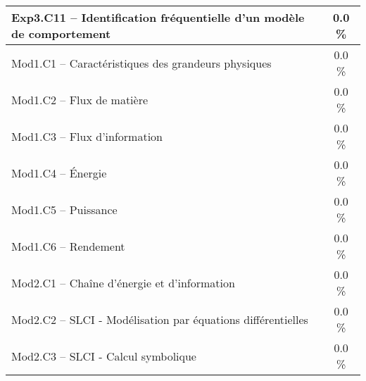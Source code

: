 \begin{center}
\begin{tabular}{|p{.7\linewidth}|c|}
Exp3.C11 -- Identification fréquentielle d’un modèle de comportement&0.0 \% \\ \hline 
Mod1.C1 -- Caractéristiques des grandeurs physiques&0.0 \% \\ \hline 
Mod1.C2 -- Flux de matière&0.0 \% \\ \hline 
Mod1.C3 -- Flux d’information&0.0 \% \\ \hline 
Mod1.C4 -- Énergie&0.0 \% \\ \hline 
Mod1.C5 -- Puissance&0.0 \% \\ \hline 
Mod1.C6 -- Rendement&0.0 \% \\ \hline 
Mod2.C1 -- Chaîne d’énergie et d'information&0.0 \% \\ \hline 
Mod2.C2 -- SLCI - Modélisation par équations différentielles&0.0 \% \\ \hline 
Mod2.C3 -- SLCI - Calcul symbolique&0.0 \% \\ \hline 
\end{tabular} 
\end{center} 
\normalsize 
 
